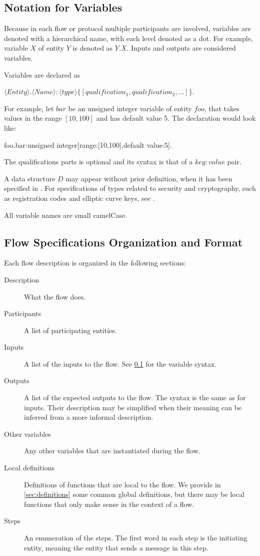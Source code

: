 \documentclass[a4paper,10pt,draft]{article}
\begin{document}
\subsection{Notation for Variables}
\label{sec:variable_notation}
Because in each flow or protocol multiple participants are involved, variables are denoted with a hierarchical name, with each level denoted as a dot. For example, variable $X$ of 
entity $Y$ is denoted as $Y.X$. Inputs and outputs are considered variables.

Variables are declared as
\begin{center}
$\langle Entity\rangle.\langle Name\rangle:\langle type\rangle\{[qualification_1, qualification_2, \dots]\}$.
\end{center}

For example, let $bar$ be an unsigned integer variable of entity $foo$, that takes values in the range $[10,100]$ and has default value 5. The declaration would look like:

\begin{center}
 foo.bar:unsigned integer[range:[10,100],default value:5].
\end{center}

The qualifications parts is optional and its syntax is that of a $key:value$ pair.

A data structure $D$ may appear without prior definition, when it has been specified in \cite{data_structure_spec}. For specifications of types related to security and 
cryptography, such as registration codes and elliptic curve keys, see \cite{crypto_spec}.

All variable names are small camelCase.

\subsection{Flow Specifications Organization and 
Format}\label{sec:flow_spec_def}
Each flow description is organized in the following sections:

\begin{description}
 \item[Description] What the flow does.
 \item[Participants] A list of participating entities.
 \item[Inputs] A list of the inputs to the flow. See \ref{sec:variable_notation} for the variable syntax.
 \item[Outputs] A list of the expected outputs to the flow. The syntax is the same as for inputs. Their description may be simplified when their meaning can be inferred from a 
more informal description.
 \item[Other variables] Any other variables that are instantiated during the flow.
 \item[Local definitions] Definitions of functions that are local to the flow. We provide in \ref{sec:definitions} some common global definitions, but there may be local functions 
that only make sense in the context of a flow.
 \item[Steps] An enumeration of the steps. The first word in each step is the initiating entity, meaning the entity that sends a message in this step.
\end{description}
\end{document}
